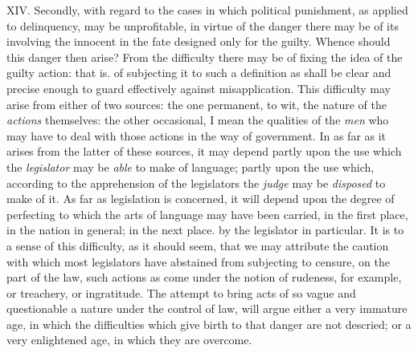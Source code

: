 \documentclass[12pt]{report}
\begin{document}
XIV. Secondly, with regard to the cases in which political punishment,
as applied to delinquency, may be unprofitable, in virtue of the danger
there may be of its involving the innocent in the fate designed only for
the guilty. Whence should this danger then arise? From the difficulty
there may be of fixing the idea of the guilty action: that is. of
subjecting it to such a definition as shall be clear and precise enough
to guard effectively against misapplication. This difficulty may arise
from either of two sources: the one permanent, to wit, the nature of the
\emph{actions} themselves: the other occasional, I mean the qualities of
the \emph{men} who may have to deal with those actions in the way of
government. In as far as it arises from the latter of these sources, it
may depend partly upon the use which the \emph{legislator} may be
\emph{able} to make of language; partly upon the use which, according to
the apprehension of the legislators the \emph{judge} may be
\emph{disposed} to make of it. As far as legislation is concerned, it
will depend upon the degree of perfecting to which the arts of language
may have been carried, in the first place, in the nation in general; in
the next place. by the legislator in particular. It is to a sense of
this difficulty, as it should seem, that we may attribute the caution
with which most legislators have abstained from subjecting to censure,
on the part of the law, such actions as come under the notion of
rudeness, for example, or treachery, or ingratitude. The attempt to
bring acts of so vague and questionable a nature under the control of
law, will argue either a very immature age, in which the difficulties
which give birth to that danger are not descried; or a very enlightened
age, in which they are overcome.
\end{document}
